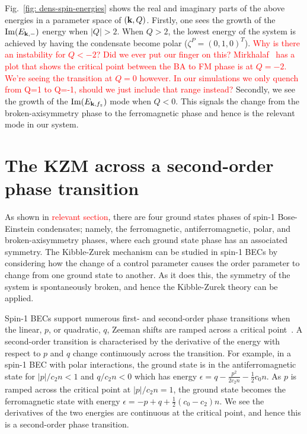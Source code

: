 Fig.~\ref{fig: dens-spin-energies} shows the real and imaginary parts of the
above energies in a parameter space of $(\vb{k}, Q)$.
Firstly, one sees the growth of the $\mathrm{Im}(E_{\vb{k}, -})$ energy
when $|Q| > 2$.
When $Q>2$, the lowest energy of the system is achieved by having the condensate
become polar ($\zeta^P=(0,1,0)^T$).
\textcolor{red}{Why is there an instability for $Q<-2$? Did we ever put our
finger on this? Mirkhalaf~\cite{Mirkhalaf2021} has a plot that shows the
critical point between the BA to FM phase is at $Q = -2$. We're 
seeing the transition at $Q=0$ however. In our simulations we only quench
from Q=1 to Q=-1, should we just include that range instead?}
Secondly, we see the growth of the $\mathrm{Im}(E_{\vb{k}, {f_z}})$ mode when
$Q<0$.
This signals the change from the broken-axisymmetry phase to the ferromagnetic
phase and hence is the relevant mode in our system.


\section{The KZM across a second-order phase transition}
As shown in \textcolor{red}{relevant section}, there are four ground states
phases of spin-1 Bose-Einstein condensates; namely, the ferromagnetic,
antiferromagnetic, polar, and broken-axisymmetry phases, where each ground
state phase has an associated symmetry.
The Kibble-Zurek mechanism can be studied in spin-1 BECs by considering how
the change of a control parameter causes the order parameter to change from 
one ground state to another.
As it does this, the symmetry of the system is spontaneously broken, and hence
the Kibble-Zurek theory can be applied.

Spin-1 BECs support numerous first- and second-order phase transitions
when the linear, $p$, or quadratic, $q$, Zeeman shifts are
ramped across a critical point~\cite{Kawaguchi2012}.
A second-order transition is characterised by the derivative of the energy with
respect to $p$ and $q$ change continuously across the transition.
For example, in a spin-1 BEC with polar interactions, the ground state is in
the antiferromagnetic state for $|p|/c_2n<1$ and $q/c_2n<0$ which has energy
$\epsilon = q - \frac{p^2}{2c_2n}-\frac{1}{2}c_0n$.
As $p$ is ramped across the critical point at $|p|/c_2n=1$, the ground state
becomes the ferromagnetic state with energy
$\epsilon = -p + q + \frac{1}{2}(c_0 - c_2)n$.
We see the derivatives of the two energies are continuous at the critical point,
and hence this is a second-order phase transition.

